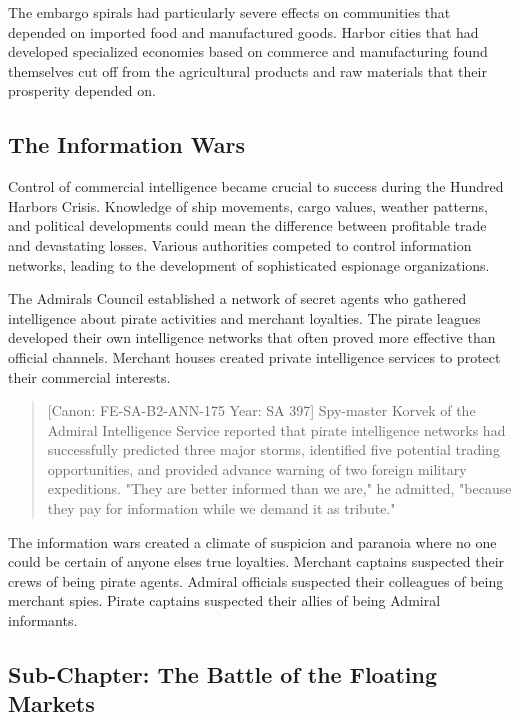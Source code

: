 The embargo spirals had particularly severe effects on communities that
depended on imported food and manufactured goods. Harbor cities that had
developed specialized economies based on commerce and manufacturing
found themselves cut off from the agricultural products and raw
materials that their prosperity depended on.

\subsection{The Information Wars}\label{the-information-wars}

Control of commercial intelligence became crucial to success during the
Hundred Harbors Crisis. Knowledge of ship movements, cargo values,
weather patterns, and political developments could mean the difference
between profitable trade and devastating losses. Various authorities
competed to control information networks, leading to the development of
sophisticated espionage organizations.

The Admiral\textquotesingle s Council established a network of secret
agents who gathered intelligence about pirate activities and merchant
loyalties. The pirate leagues developed their own intelligence networks
that often proved more effective than official channels. Merchant houses
created private intelligence services to protect their commercial
interests.

\begin{quote}
{[}Canon: FE-SA-B2-ANN-175 \textbar{} Year: SA 397{]} Spy-master Korvek
of the Admiral Intelligence Service reported that pirate intelligence
networks had successfully predicted three major storms, identified five
potential trading opportunities, and provided advance warning of two
foreign military expeditions. "They are better informed than we are," he
admitted, "because they pay for information while we demand it as
tribute."
\end{quote}

The information wars created a climate of suspicion and paranoia where
no one could be certain of anyone else\textquotesingle s true loyalties.
Merchant captains suspected their crews of being pirate agents. Admiral
officials suspected their colleagues of being merchant spies. Pirate
captains suspected their allies of being Admiral informants.

\subsection{Sub-Chapter: The Battle of the Floating
Markets}\label{sub-chapter-the-battle-of-the-floating-markets}

